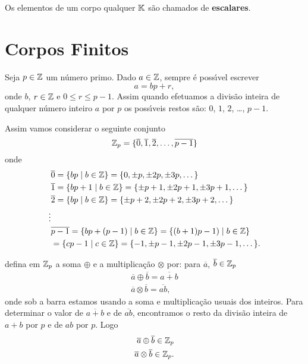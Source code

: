 \begin{observacao}
	Os elementos de um corpo qualquer $\mathbb{K}$ s\~ao chamados de \textbf{escalares}.
\end{observacao}

\section{Corpos Finitos}\label{sec:corpor_finitos}

Seja $p \in \mathbb{Z}$ um n\'umero primo. Dado $a \in \mathbb{Z}$, sempre \'e poss{\'\i}vel escrever
\[
a = bp + r,
\]
onde $b$, $r \in \mathbb{Z}$ e $0 \le r \le p - 1$. Assim quando efetuamos a divis\~ao inteira de qualquer n\'umero inteiro $a$ por $p$ os poss{\'\i}veis restos s\~ao: $0$, 
$1$, $2$, \dots, $p -1 $.

Assim vamos considerar o seguinte conjunto
\[
\mathbb{Z}_p = \{\overline{0}, \overline{1}, \overline{2}, \dots, \overline{p - 1}\}
\]
onde
\begin{align*}
	&\overline{0} = \{bp \mid b \in \mathbb{Z}\} = \{0, \pm p, \pm 2p, \pm 3p, \dots\}\\
	&\overline{1} = \{bp + 1\mid b \in \mathbb{Z}\} = \{\pm p + 1, \pm 2p + 1, \pm 3p + 1, \dots\}\\
	&\overline{2} = \{bp \mid b \in \mathbb{Z}\} = \{\pm p + 2, \pm 2p + 2, \pm 3p + 2, \dots\}\\
	\vdots\\
	&\overline{p - 1} = \{bp + (p - 1) \mid b \in \mathbb{Z}\} = \{(b + 1)p - 1) \mid b \in \mathbb{Z}\}\\ &= \{cp - 1 \mid c \in \mathbb{Z}\} = \{-1, \pm p - 1, \pm 2p - 1, \pm 3p - 1, \dots\}.
\end{align*}

defina em $\mathbb{Z}_p$ a soma $\oplus$ e a multiplica\c{c}\~ao $\otimes$ por: para $\overline{a}$, $\overline{b} \in \mathbb{Z}_p$
\begin{align*}
	\overline{a} \oplus \overline{b} = \overline{a + b}\\
	\overline{a} \otimes \overline{b} = \overline{ab},
\end{align*}
onde sob a barra estamos usando a soma e multiplica\c{c}\~ao usuais dos inteiros. Para determinar o valor de $\overline{a + b}$ e de $\overline{ab}$, encontramos o resto da divis\~ao inteira de $a + b$ por $p$ e de $ab$ por $p$. Logo
\begin{align*}
	\overline{a} \oplus \overline{b} \in \mathbb{Z}_p\\
	\overline{a} \otimes \overline{b} \in \mathbb{Z}_p.
\end{align*}

